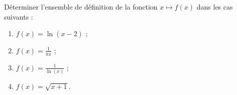 
\begin{exercice}\label{exointerro-0005}

Déterminer l'ensemble de définition de la fonction $x\mapsto f(x)$ dans les cas suivants :
\begin{enumerate}
\item 
  $\displaystyle f(x)=\ln (x-2)$ ;
  \item
    $\displaystyle f(x)=\frac{1}{\pi x}$ ;
    \item 
      $\displaystyle f(x)=\frac{1}{\ln (x)}$ ;
      \item 
        $\displaystyle f(x)=\sqrt{x+1}$.
\end{enumerate}


\end{exercice}
